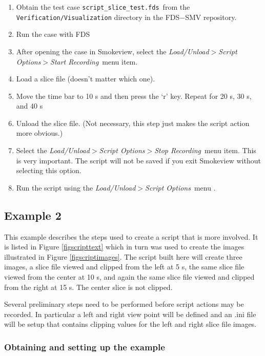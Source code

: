 \documentclass[11pt,twoside]{book}
\begin{document}
\begin{enumerate}
\item Obtain the test case {\tt script\_slice\_test.fds}\ from the
    {\tt Verification/Visualization} directory in
the FDS$-$SMV repository.
\item Run the case with FDS
\item After opening the case in Smokeview,
select the {\em Load/Unload$>$Script Options$>$Start Recording}\ menu item.
\item Load a slice file (doesn't matter which one).
\item Move the time bar to 10 s and
then press the `r' key.  Repeat for 20 s, 30 s, and 40 s
\item Unload the slice file. (Not necessary, this step just makes the script action more obvious.)
\item Select the {\em Load/Unload$>$Script Options$>$Stop Recording}\ menu item.  This is very important.  The script will not be saved
if you exit Smokeview without selecting this option.
\item Run the script using the
  {\em Load/Unload$>$Script Options}\ menu .
\end{enumerate}

\subsection{Example 2}
This example describes the steps used to create a script that is more involved.
It is listed
in Figure \ref{figscripttext} which in turn was used to
create the images
illustrated in Figure \ref{figscriptimages}.  The script built here
will create three images,
a slice file viewed and clipped from the left at 5 s,
the same slice file viewed from the center at 10 s,
and again the same slice file viewed and clipped from the right at 15 s.
The center slice is not clipped.

Several preliminary steps need to be performed before script actions may be recorded.
In particular a left and right view point will be defined and
an .ini file will be setup that contains clipping values for the
left and right slice file images.

\subsubsection{Obtaining and setting up the example}
\end{document}
